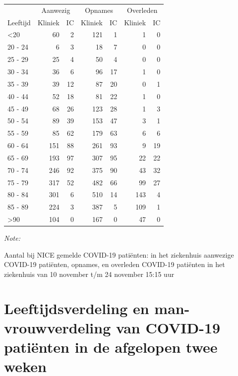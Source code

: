 \documentclass[
  english,
  man,floatsintext]{apa6}
\begin{document}
\begin{table}
\centering\begingroup\fontsize{10}{12}\selectfont

\begin{threeparttable}
\begin{tabular}{lrrrrrr}
\toprule
\multicolumn{1}{c}{ } & \multicolumn{2}{c}{Aanwezig} & \multicolumn{2}{c}{Opnames} & \multicolumn{2}{c}{Overleden} \\
\cmidrule(l{3pt}r{3pt}){2-3} \cmidrule(l{3pt}r{3pt}){4-5} \cmidrule(l{3pt}r{3pt}){6-7}
Leeftijd & Kliniek & IC & Kliniek & IC & Kliniek & IC\\
\midrule
<20 & 60 & 2 & 121 & 1 & 1 & 0\\
20 - 24 & 6 & 3 & 18 & 7 & 0 & 0\\
25 - 29 & 25 & 4 & 50 & 4 & 0 & 0\\
30 - 34 & 36 & 6 & 96 & 17 & 1 & 0\\
35 - 39 & 39 & 12 & 87 & 20 & 0 & 1\\
40 - 44 & 52 & 18 & 81 & 22 & 1 & 0\\
45 - 49 & 68 & 26 & 123 & 28 & 1 & 3\\
50 - 54 & 89 & 39 & 153 & 47 & 3 & 1\\
55 - 59 & 85 & 62 & 179 & 63 & 6 & 6\\
60 - 64 & 151 & 88 & 261 & 93 & 9 & 19\\
65 - 69 & 193 & 97 & 307 & 95 & 22 & 22\\
70 - 74 & 246 & 92 & 375 & 90 & 43 & 32\\
75 - 79 & 317 & 52 & 482 & 66 & 99 & 27\\
80 - 84 & 301 & 6 & 510 & 14 & 143 & 4\\
85 - 89 & 224 & 3 & 387 & 5 & 109 & 1\\
>90 & 104 & 0 & 167 & 0 & 47 & 0\\
\bottomrule
\end{tabular}
\begin{tablenotes}
\item \textit{Note: } 
\item Aantal bij NICE gemelde COVID-19 patiënten: in het ziekenhuis aanwezige COVID-19 patiënten, opnames, en overleden COVID-19 patiënten in het ziekenhuis van 10 november t/m 24 november 15:15 uur
\end{tablenotes}
\end{threeparttable}
\endgroup{}
\end{table}

\newpage

\hypertarget{leeftijdsverdeling-en-man-vrouwverdeling-van-covid-19-patiuxebnten-in-de-afgelopen-twee-weken}{%
\section{Leeftijdsverdeling en man-vrouwverdeling van COVID-19 patiënten in de afgelopen twee weken}\label{leeftijdsverdeling-en-man-vrouwverdeling-van-covid-19-patiuxebnten-in-de-afgelopen-twee-weken}}
\end{document}
